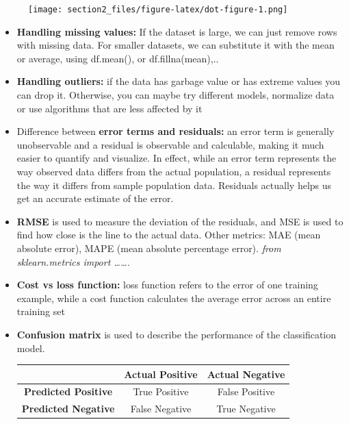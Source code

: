 \documentclass[
  letterpaper,
  DIV=11,
  numbers=noendperiod]{scrreprt}
\begin{document}
\begin{figure}[H]

{\centering \texttt{[image: section2\_files/figure-latex/dot-figure-1.png]}

}

\end{figure}

\hfill\break

\begin{itemize}
\item
  \textbf{Handling missing values:} If the dataset is large, we can just
  remove rows with missing data. For smaller datasets, we can substitute
  it with the mean or average, using df.mean(), or df.fillna(mean),..
\item
  \textbf{Handling outliers:} if the data has garbage value or has
  extreme values you can drop it. Otherwise, you can maybe try different
  models, normalize data or use algorithms that are less affected by it
\item
  Difference between \textbf{error terms and residuals:} an error term
  is generally unobservable and a residual is observable and calculable,
  making it much easier to quantify and visualize. In effect, while an
  error term represents the way observed data differs from the actual
  population, a residual represents the way it differs from sample
  population data. Residuals actually helps us get an accurate estimate
  of the error.
\item
  \textbf{RMSE} is used to measure the deviation of the residuals, and
  MSE is used to find how close is the line to the actual data. Other
  metrics: MAE (mean absolute error), MAPE (mean absolute percentage
  error). \emph{from sklearn.metrics import \ldots\ldots.}
\item
  \textbf{Cost vs loss function:} loss function refers to the error of
  one training example, while a cost function calculates the average
  error across an entire training set
\item
  \textbf{Confusion matrix} is used to describe the performance of the
  classification model.

  \begin{longtable}[]{@{}ccc@{}}
  \toprule\noalign{}
  & Actual Positive & Actual Negative \\
  \midrule\noalign{}
  \endhead
  \bottomrule\noalign{}
  \endlastfoot
  \textbf{Predicted Positive} & True Positive & False Positive \\
  \textbf{Predicted Negative} & False Negative & True Negative \\
  \end{longtable}


\end{itemize}
\end{document}
